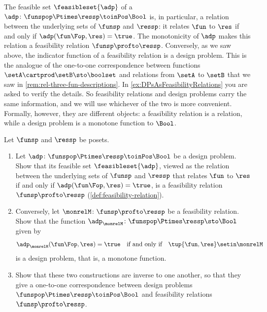 The feasible set $\feasibleset{\adp}$ of a  $\adp \colon \funspop \Ptimes \ressp\toinPos \Bool$ is, in particular, a relation between the underlying sets of $\funsp$ and $\ressp$: it relates $\fun$ to $\res$ if and only if $\adp(\fun\Fop, \res) = \true$.
The monotonicity of $\adp$ makes this relation a feasibility relation $\funsp \profto \ressp$.
Conversely, as we saw above, the indicator function of a feasibility relation is a design problem.
This is the analogue of the one-to-one correspondence between functions $\setA \cartprod \setB \sto \boolset$ and relations from $\setA$ to $\setB$ that we saw in \cref{rem:rel-three-fun-descriptions}.
In \cref{ex:DPsAsFeasibilityRelations} you are asked to verify the details.
So feasibility relations and design problems carry the same information, and we will use whichever of the two is more convenient.
Formally, however, they are different objects: a feasibility relation is a relation, while a design problem is a monotone function to $\Bool$.

\begin{gradedexercise}
    \label{ex:DPsAsFeasibilityRelations}
    Let $\funsp$ and $\ressp$ be posets.
    \begin{enumerate}
        \item Let $\adp \colon \funspop \Ptimes \ressp \toinPos \Bool$ be a design problem.
              Show that its feasible set $\feasibleset{\adp}$, viewed as the relation between the underlying sets of $\funsp$ and $\ressp$ that relates $\fun$ to $\res$ if and only if $\adp(\fun\Fop, \res) = \true$, is a feasibility relation $\funsp \profto \ressp$ (\cref{def:feasibility-relation}).
        \item Conversely, let $\monrelM \colon \funsp \profto \ressp$ be a feasibility relation.
              Show that the function $\adp_\monrelM \colon \funspop \Ptimes \ressp \sto \Bool$ given by
              \begin{equation*}
                  \adp_\monrelM(\fun\Fop, \res) = \true
                  \quad \text{if and only if} \quad
                  \tup{\fun, \res} \setin \monrelM
              \end{equation*}
              is a design problem, that is, a monotone function.
        \item Show that these two constructions are inverse to one another, so that they give a one-to-one correspondence between design problems $\funspop \Ptimes \ressp \toinPos \Bool$ and feasibility relations $\funsp \profto \ressp$.
    \end{enumerate}
\end{gradedexercise}

